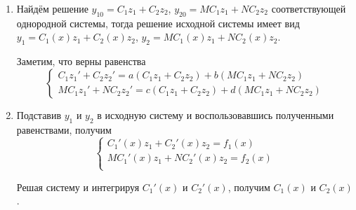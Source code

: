 \begin{enumerate}
	\item Найдём решение $y_{10} = C_1 z_1 + C_2 z_2$, $y_{20} = M C_1 z_1 + N C_2 z_2$ соответствующей однородной системы, тогда решение исходной системы имеет вид $y_1 = C_1(x) z_1 + C_2(x) z_2$, $y_2 = M C_1(x) z_1 + N C_2(x) z_2$.
	
	Заметим, что верны равенства
	\begin{equation*}
	\begin{cases}
	C_1 z_1' + C_2 z_2' = a(C_1 z_1 + C_2 z_2) + b(M C_1 z_1 + N C_2 z_2) \\
	M C_1 z_1' + N C_2 z_2' = c(C_1 z_1 + C_2 z_2) + d(M C_1 z_1 + N C_2 z_2)
	\end{cases}
	\end{equation*}
	
	\item Подставив $y_1$ и $y_2$ в исходную систему и воспользовавшись полученными равенствами, получим
	\begin{equation*}
	\begin{cases}
	C_1'(x) z_1 + C_2'(x) z_2 = f_1(x) \\
	M C_1'(x) z_1 + N C_2'(x) z_2 = f_2(x) \\
	\end{cases}
	\end{equation*}
	
	Решая систему и интегрируя $C_1'(x)$ и $C_2'(x)$, получим $C_1(x)$ и $C_2(x)$.
\end{enumerate}